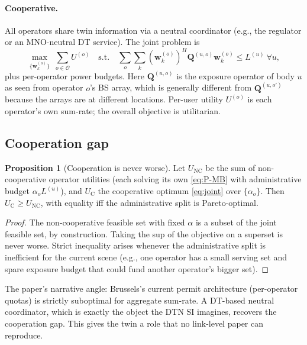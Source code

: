 \documentclass[11pt,a4paper]{article}
\theoremstyle{definition}
\newtheorem{proposition}[proposition]{Proposition}
\newcommand{\ww}{\mathbf{w}}
\newcommand{\Q}{\mathbf{Q}}
\newcommand{\Ops}{\mathcal{O}}
\begin{document}
\paragraph{Cooperative.} All operators share twin information via a
neutral coordinator (e.g., the regulator or an MNO-neutral DT
service). The joint problem is
\begin{equation}\label{eq:joint}
  \max_{\{\ww_k^{(o)}\}}\;\sum_{o\in\Ops} U^{(o)}
  \quad\text{s.t.}\quad
  \sum_o \sum_k (\ww_k^{(o)})^H\Q^{(u,o)}\ww_k^{(o)}
  \le L^{(u)}\ \forall u,
\end{equation}
plus per-operator power budgets. Here $\Q^{(u,o)}$ is the exposure
operator of body $u$ as seen from operator $o$'s BS array, which is
generally different from $\Q^{(u,o')}$ because the arrays are at
different locations. Per-user utility $U^{(o)}$ is each operator's
own sum-rate; the overall objective is utilitarian.

\subsection{Cooperation gap}

\begin{proposition}[Cooperation is never worse]\label{prop:coop}
Let $U_{\mathrm{NC}}$ be the sum of non-cooperative operator
utilities (each solving its own \eqref{eq:P-MB} with administrative
budget $\alpha_o L^{(u)}$), and $U_{\mathrm{C}}$ the cooperative
optimum \eqref{eq:joint} over $\{\alpha_o\}$. Then
$U_{\mathrm{C}}\ge U_{\mathrm{NC}}$, with equality iff the
administrative split is Pareto-optimal.
\end{proposition}

\begin{proof}
The non-cooperative feasible set with fixed $\alpha$ is a subset of
the joint feasible set, by construction. Taking the sup of the
objective on a superset is never worse. Strict inequality arises
whenever the administrative split is inefficient for the current
scene (e.g., one operator has a small serving set and spare exposure
budget that could fund another operator's bigger set).
\end{proof}

The paper's narrative angle: Brussels's current permit architecture
(per-operator quotas) is strictly suboptimal for aggregate sum-rate.
A DT-based neutral coordinator, which is exactly the object the DTN
SI imagines, recovers the cooperation gap. This gives the twin a
role that no link-level paper can reproduce.
\end{document}

